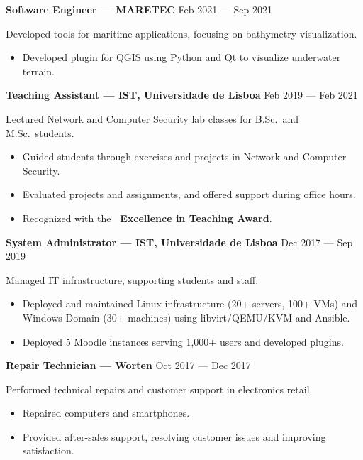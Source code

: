 \documentclass[11pt,a4paper]{article}
\begin{document}
\textbf{Software Engineer --- MARETEC}
\hfill
Feb 2021 --- Sep 2021

Developed tools for maritime applications, focusing on bathymetry visualization.

\begin{itemize}[noitemsep]
  \item Developed plugin for QGIS using Python and Qt to visualize underwater
  terrain.
\end{itemize}

\textbf{Teaching Assistant --- IST, Universidade de Lisboa}
\hfill
Feb 2019 --- Feb 2021

Lectured Network and Computer Security lab classes for B.Sc.\ and M.Sc.\
students.

\begin{itemize}[noitemsep]
  \item Guided students through exercises and projects in Network and
  Computer Security.
  \item Evaluated projects and assignments, and offered support during
  office hours.
  \item Recognized with the \textbf{\faAward\ Excellence in Teaching Award}.
\end{itemize}

\textbf{System Administrator --- IST, Universidade de Lisboa}
\hfill
Dec 2017 --- Sep 2019

Managed IT infrastructure, supporting students and staff.

\begin{itemize}[noitemsep]
  \item Deployed and maintained Linux infrastructure (20+ servers, 100+ VMs) and
  Windows Domain (30+ machines) using libvirt/QEMU/KVM and Ansible.
  \item Deployed 5 Moodle instances serving 1,000+ users and developed
  plugins.
\end{itemize}

\textbf{Repair Technician --- Worten}
\hfill
Oct 2017 --- Dec 2017

Performed technical repairs and customer support in electronics retail.

\begin{itemize}[noitemsep]
  \item Repaired computers and smartphones.
  \item Provided after-sales support, resolving customer issues and improving
  satisfaction.
\end{itemize}
\end{document}
